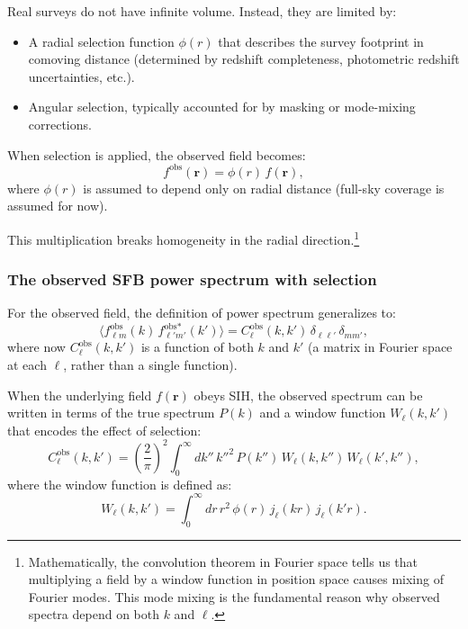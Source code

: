 Real surveys do not have infinite volume. Instead, they are limited by:
\begin{itemize}
\item A radial selection function $\phi(r)$ that describes the survey footprint in comoving distance (determined
by redshift completeness, photometric redshift uncertainties, etc.).
\item Angular selection, typically accounted for by masking or mode-mixing corrections.
\end{itemize}

When selection is applied, the observed field becomes:
\begin{equation}
f^{\text{obs}}(\mathbf{r}) = \phi(r)\,f(\mathbf{r}),
\label{eq:observed_field_with_selection}
\end{equation}
where $\phi(r)$ is assumed to depend only on radial distance (full-sky coverage is assumed for now).

This multiplication breaks homogeneity in the radial direction.\footnote{Mathematically, the convolution theorem in
Fourier space tells us that multiplying a field by a window function in position space causes mixing of Fourier modes.
This mode mixing is the fundamental reason why observed spectra depend on both $k$ and $\ell$.}

\subsubsection{The observed SFB power spectrum with selection}

For the observed field, the definition of power spectrum generalizes to:
\begin{equation}
\bigl\langle f^{\text{obs}}_{\ell m}(k)\,f^{\text{obs}*}_{\ell' m'}(k')\bigr\rangle
= C^{\text{obs}}_\ell(k,k')\,\delta_{\ell\ell'}\,\delta_{mm'},
\label{eq:observed_power_general}
\end{equation}
where now $C^{\text{obs}}_\ell(k,k')$ is a function of both $k$ and $k'$ (a matrix in Fourier space at each $\ell$,
rather than a single function).

When the underlying field $f(\mathbf{r})$ obeys SIH, the observed spectrum can be written in terms of the true
spectrum $P(k)$ and a window function $W_\ell(k,k')$ that encodes the effect of selection:
\begin{equation}
C^{\text{obs}}_\ell(k,k') = \left(\frac{2}{\pi}\right)^2
\int_0^\infty dk''\, k''^2\,P(k'')\,W_\ell(k,k'')\,W_\ell(k',k''),
\label{eq:observed_power_window}
\end{equation}
where the window function is defined as:
\begin{equation}
W_\ell(k,k') = \int_0^\infty dr\,r^2\,\phi(r)\,j_\ell(kr)\,j_\ell(k'r).
\label{eq:window_function_def}
\end{equation}

